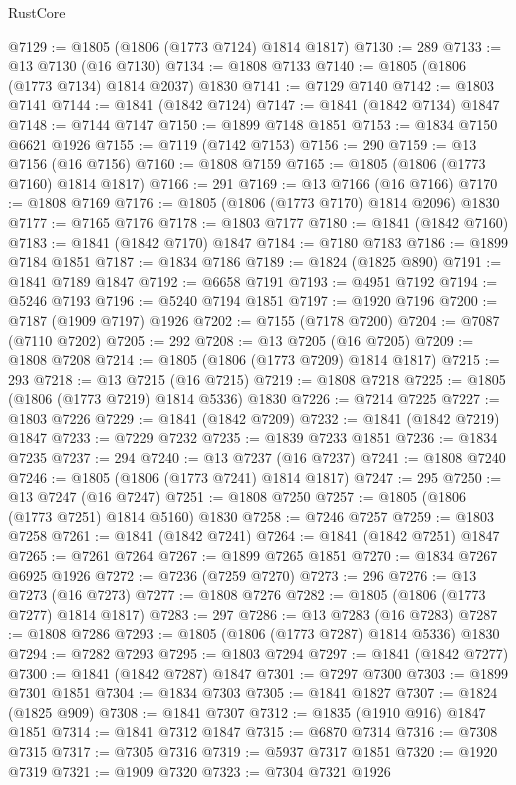 \begin{lexlean}{RustCore}
\begin{coremodule}
@7129 := @1805 (@1806 (@1773 @7124) @1814 @1817)
@7130 := 289
@7133 := @13 @7130 (@16 @7130)
@7134 := @1808 @7133
@7140 := @1805 (@1806 (@1773 @7134) @1814 @2037) @1830
@7141 := @7129 @7140
@7142 := @1803 @7141
@7144 := @1841 (@1842 @7124)
@7147 := @1841 (@1842 @7134) @1847
@7148 := @7144 @7147
@7150 := @1899 @7148 @1851
@7153 := @1834 @7150 @6621 @1926
@7155 := @7119 (@7142 @7153)
@7156 := 290
@7159 := @13 @7156 (@16 @7156)
@7160 := @1808 @7159
@7165 := @1805 (@1806 (@1773 @7160) @1814 @1817)
@7166 := 291
@7169 := @13 @7166 (@16 @7166)
@7170 := @1808 @7169
@7176 := @1805 (@1806 (@1773 @7170) @1814 @2096) @1830
@7177 := @7165 @7176
@7178 := @1803 @7177
@7180 := @1841 (@1842 @7160)
@7183 := @1841 (@1842 @7170) @1847
@7184 := @7180 @7183
@7186 := @1899 @7184 @1851
@7187 := @1834 @7186
@7189 := @1824 (@1825 @890)
@7191 := @1841 @7189 @1847
@7192 := @6658 @7191
@7193 := @4951 @7192
@7194 := @5246 @7193
@7196 := @5240 @7194 @1851
@7197 := @1920 @7196
@7200 := @7187 (@1909 @7197) @1926
@7202 := @7155 (@7178 @7200)
@7204 := @7087 (@7110 @7202)
@7205 := 292
@7208 := @13 @7205 (@16 @7205)
@7209 := @1808 @7208
@7214 := @1805 (@1806 (@1773 @7209) @1814 @1817)
@7215 := 293
@7218 := @13 @7215 (@16 @7215)
@7219 := @1808 @7218
@7225 := @1805 (@1806 (@1773 @7219) @1814 @5336) @1830
@7226 := @7214 @7225
@7227 := @1803 @7226
@7229 := @1841 (@1842 @7209)
@7232 := @1841 (@1842 @7219) @1847
@7233 := @7229 @7232
@7235 := @1839 @7233 @1851
@7236 := @1834 @7235
@7237 := 294
@7240 := @13 @7237 (@16 @7237)
@7241 := @1808 @7240
@7246 := @1805 (@1806 (@1773 @7241) @1814 @1817)
@7247 := 295
@7250 := @13 @7247 (@16 @7247)
@7251 := @1808 @7250
@7257 := @1805 (@1806 (@1773 @7251) @1814 @5160) @1830
@7258 := @7246 @7257
@7259 := @1803 @7258
@7261 := @1841 (@1842 @7241)
@7264 := @1841 (@1842 @7251) @1847
@7265 := @7261 @7264
@7267 := @1899 @7265 @1851
@7270 := @1834 @7267 @6925 @1926
@7272 := @7236 (@7259 @7270)
@7273 := 296
@7276 := @13 @7273 (@16 @7273)
@7277 := @1808 @7276
@7282 := @1805 (@1806 (@1773 @7277) @1814 @1817)
@7283 := 297
@7286 := @13 @7283 (@16 @7283)
@7287 := @1808 @7286
@7293 := @1805 (@1806 (@1773 @7287) @1814 @5336) @1830
@7294 := @7282 @7293
@7295 := @1803 @7294
@7297 := @1841 (@1842 @7277)
@7300 := @1841 (@1842 @7287) @1847
@7301 := @7297 @7300
@7303 := @1899 @7301 @1851
@7304 := @1834 @7303
@7305 := @1841 @1827
@7307 := @1824 (@1825 @909)
@7308 := @1841 @7307
@7312 := @1835 (@1910 @916) @1847 @1851
@7314 := @1841 @7312 @1847
@7315 := @6870 @7314
@7316 := @7308 @7315
@7317 := @7305 @7316
@7319 := @5937 @7317 @1851
@7320 := @1920 @7319
@7321 := @1909 @7320
@7323 := @7304 @7321 @1926

\end{coremodule}
\end{lexlean}
